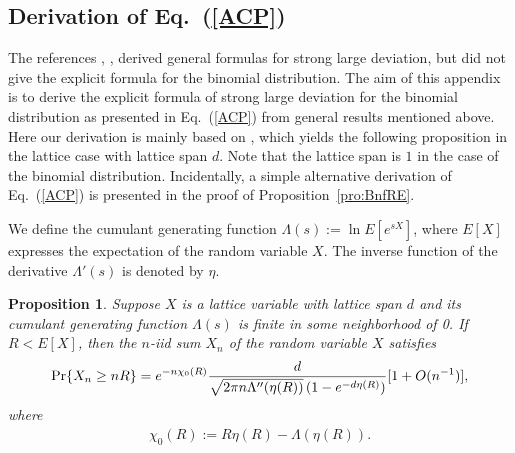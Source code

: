 \documentclass[aop]{imsart}
\theoremstyle{plain}
\newtheorem{proposition}[theorem]{Proposition}
\theoremstyle{remark}
\newcommand{\1}{\operatorname{\uppercase\expandafter{\romannumeral1}}}
\newcommand{\2}{\operatorname{\uppercase\expandafter{\romannumeral2}}}
\newcommand{\3}{\operatorname{\uppercase\expandafter{\romannumeral3}}}
\newcommand{\4}{\operatorname{\uppercase\expandafter{\romannumeral4}}}
\newcommand{\5}{\operatorname{\uppercase\expandafter{\romannumeral5}}}
\newcommand{\6}{\operatorname{\uppercase\expandafter{\romannumeral6}}}
\newcommand{\7}{\operatorname{\uppercase\expandafter{\romannumeral7}}}
\newcommand{\8}{\operatorname{\uppercase\expandafter{\romannumeral8}}}
\newcommand{\9}{\operatorname{\uppercase\expandafter{\romannumeral9}}}
\newcommand{\eref}[1]{Eq.~\textup{(\ref{#1})}}
\newcommand{\pref}[1]{Proposition~\ref{#1}}
\begin{document}
\begin{appendix}


\section{Derivation of \eref{ACP}}\label{A1}
The references \cite[Theorem 4]{BlacH59}, \cite[Case 2]{BahaR60}, \cite[Theorem 3.7.4]{DembZ10} derived general formulas for strong large deviation, but did not give the explicit formula for the binomial distribution.
The aim of this appendix is to derive the explicit formula of strong large deviation  for the binomial distribution as presented in \eref{ACP} from general results mentioned above. Here our derivation is mainly based on \cite[Theorem 3.7.4]{DembZ10}, which
yields the following proposition  in the lattice case with lattice span $d$. Note that
 the lattice span is $1$ in the case of the binomial distribution. Incidentally, a simple alternative derivation of \eref{ACP} is presented in the proof of \pref{pro:BnfRE}. 



We define the cumulant generating function 
$\Lambda (s):= \ln E [e^{sX}]$, where
$E [X]$ expresses the expectation of the random variable $X$.
The inverse function of the derivative $\Lambda' (s) $ is denoted by $\eta$.


\begin{proposition}
	Suppose $X$ is a lattice variable with lattice span $d$ and its cumulant generating function  $\Lambda (s)$ is finite in some neighborhood of 0. If $R < E[X]$, 
	then the $n$-iid sum $X_n$ of the random variable $X$ satisfies 
	\begin{align}
	{\rm Pr}\{ X_n \ge n R\}=e^{-n \chi_0(R)}
	\frac{d }{ \sqrt{2\pi n \Lambda''(\eta(R) ) }\, (1-e^{-d \eta(R)})}
	[1+O(n^{-1})],\label{JJ1}
	\end{align}
	where
	\begin{align}
	\chi_0(R) := R \eta(R) - \Lambda (\eta (R)) .\label{AMF}
	\end{align}
\end{proposition}




\end{appendix}
\end{document}
